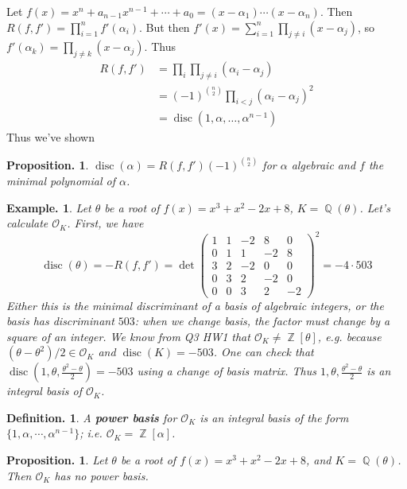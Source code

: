 \documentclass[11pt, a4paper]{memoir}
\DeclareMathOperator{\Q}{{\mathbb{Q}}}
\DeclareMathOperator{\Z}{{\mathbb{Z}}}
\theoremstyle{change}
\newtheorem{proposition}[theorem]{Proposition.}
\theoremstyle{plain}
\theoremstyle{nonumberplain}
\newtheorem{definition}{Definition.}
\newtheorem{example}{Example.}
\DeclareMathOperator{\disc}{disc}
\begin{document}
Let $f(x)=x^n+a_{n-1}x^{n-1}+\cdots+a_0=(x-\alpha_1)\cdots(x-\alpha_n)$.
Then $R(f,f')=\prod_{i=1}^n f'(\alpha_i)$.
But then $f'(x)=\sum_{i=1}^n\prod_{j\neq i}(x-\alpha_j)$, so $f'(\alpha_k)=\prod_{j\neq k}(x-\alpha_j)$.
Thus
\begin{align*}
    R(f,f') &= \prod_{i}\prod_{j\neq i}(\alpha_i-\alpha_j)\\
            &= (-1)^{\binom{n}{2}}\prod_{i<j}(\alpha_i-\alpha_j)^2\\
            &= \disc(1,\alpha,\ldots,\alpha^{n-1})
\end{align*}
Thus we've shown
\begin{proposition}
    $\disc(\alpha)=R(f,f')(-1)^{\binom{n}{2}}$ for $\alpha$ algebraic and $f$ the minimal polynomial of $\alpha$.
\end{proposition}
\begin{example}
    Let $\theta$ be a root of $f(x)=x^3+x^2-2x+8$, $K=\Q(\theta)$.
    Let's calculate $\mathcal{O}_K$.
    First, we have
    \begin{equation*}
        \disc(\theta)=-R(f,f')=
        \det
        \begin{pmatrix}
            1&1&-2&8&0\\
            0&1&1&-2&8\\
            3&2&-2&0&0\\
            0&3&2&-2&0\\
            0&0&3&2&-2
        \end{pmatrix}^2
        =-4\cdot 503
    \end{equation*}
    Either this is the minimal discriminant of a basis of algebraic integers, or the basis has discriminant $503$: when we change basis, the factor must change by a square of an integer.
    We know from Q3 HW1 that $\mathcal{O}_K\neq\Z[\theta]$, e.g. because $(\theta-\theta^2)/2\in\mathcal{O}_K$ and $\disc(K)=-503$.
    One can check that $\disc(1,\theta,\frac{\theta^2-\theta}{2})=-503$ using a change of basis matrix.
    Thus $1,\theta,\frac{\theta^2-\theta}{2}$ is an integral basis of $\mathcal{O}_K$.
\end{example}
\begin{definition}
    A \textbf{power basis} for $\mathcal{O}_K$ is an integral basis of the form $\{1,\alpha,\cdots,\alpha^{n-1}\}$; i.e. $\mathcal{O}_K=\Z[\alpha]$.
\end{definition}
\begin{proposition}
    Let $\theta$ be a root of $f(x)=x^3+x^2-2x+8$, and $K=\Q(\theta)$.
    Then $\mathcal{O}_K$ has no power basis.
\end{proposition}
\end{document}
